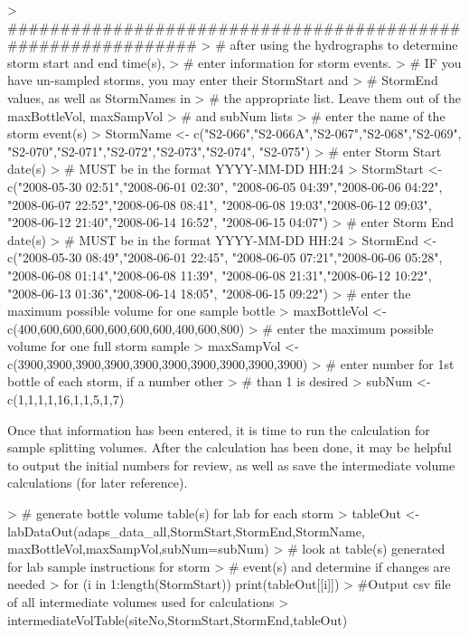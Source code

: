 \documentclass[a4paper,11pt]{article}
\begin{document}
\begin{Schunk}
\begin{Sinput}
> #############################################################
> # after using the hydrographs to determine storm start and end time(s), 
> # enter information for storm events.
> # IF you have un-sampled storms, you may enter their StormStart and  
> # StormEnd values, as well as StormNames in 
> # the appropriate list. Leave them out of the maxBottleVol, maxSampVol  
> # and subNum lists
> # enter the name of the storm event(s)
> StormName <- c("S2-066","S2-066A","S2-067","S2-068","S2-069",
                "S2-070","S2-071","S2-072","S2-073","S2-074",
                "S2-075")
> # enter Storm Start date(s)
> # MUST be in the format YYYY-MM-DD HH:24
> StormStart <- c("2008-05-30 02:51","2008-06-01 02:30",
                 "2008-06-05 04:39","2008-06-06 04:22",
                 "2008-06-07 22:52","2008-06-08 08:41",
                 "2008-06-08 19:03","2008-06-12 09:03",
                 "2008-06-12 21:40","2008-06-14 16:52",
                 "2008-06-15 04:07")
> # enter Storm End date(s) 
> # MUST be in the format YYYY-MM-DD HH:24
> StormEnd <- c("2008-05-30 08:49","2008-06-01 22:45",
               "2008-06-05 07:21","2008-06-06 05:28",
               "2008-06-08 01:14","2008-06-08 11:39",
               "2008-06-08 21:31","2008-06-12 10:22",
               "2008-06-13 01:36","2008-06-14 18:05",
               "2008-06-15 09:22")
> # enter the maximum possible volume for one sample bottle
> maxBottleVol <- c(400,600,600,600,600,600,600,400,600,800)
> # enter the maximum possible volume for one full storm sample
> maxSampVol <- c(3900,3900,3900,3900,3900,3900,3900,3900,3900,3900)
> # enter number for 1st bottle of each storm, if a number other 
> # than 1 is desired
> subNum <- c(1,1,1,1,16,1,1,5,1,7)
\end{Sinput}
\end{Schunk}

Once that information has been entered, it is time to run the calculation for sample splitting volumes. After the calculation has been done, it may be helpful to output the initial numbers for review, as well as save the intermediate volume calculations (for later reference).

\begin{Schunk}
\begin{Sinput}
> # generate bottle volume table(s) for lab for each storm
> tableOut <- labDataOut(adaps_data_all,StormStart,StormEnd,StormName,
                        maxBottleVol,maxSampVol,subNum=subNum)
> # look at table(s) generated for lab sample instructions for storm 
> # event(s) and determine if changes are needed
> for (i in 1:length(StormStart)){
   print(tableOut[[i]])
 }
> #Output csv file of all intermediate volumes used for calculations
> intermediateVolTable(siteNo,StormStart,StormEnd,tableOut)
\end{Sinput}
\end{Schunk}
\end{document}
